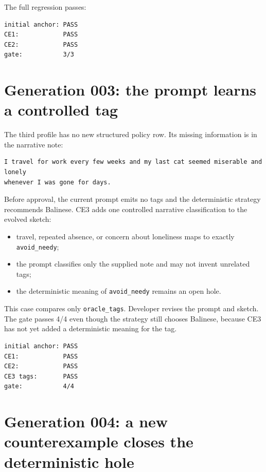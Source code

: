 The full regression passes:

\begin{verbatim}
initial anchor: PASS
CE1:            PASS
CE2:            PASS
gate:           3/3
\end{verbatim}

\section{Generation 003: the prompt learns a controlled tag}\label{generation-003-the-prompt-learns-a-controlled-tag}

The third profile has no new structured policy row. Its missing information is in the narrative
note:

\begin{verbatim}
I travel for work every few weeks and my last cat seemed miserable and lonely
whenever I was gone for days.
\end{verbatim}

Before approval, the current prompt emits no tags and the deterministic strategy recommends
Balinese. CE3 adds one controlled narrative classification to the evolved sketch:

\begin{itemize}
\tightlist
\item
  travel, repeated absence, or concern about loneliness maps to exactly \texttt{avoid\_needy};
\item
  the prompt classifies only the supplied note and may not invent unrelated tags;
\item
  the deterministic meaning of \texttt{avoid\_needy} remains an open hole.
\end{itemize}

This case compares only \texttt{oracle\_tags}. Developer revises the prompt and sketch. The gate
passes 4/4 even though the strategy still chooses Balinese, because CE3 has not yet added a
deterministic meaning for the tag.

\begin{verbatim}
initial anchor: PASS
CE1:            PASS
CE2:            PASS
CE3 tags:       PASS
gate:           4/4
\end{verbatim}

\section{Generation 004: a new counterexample closes the deterministic hole}\label{generation-004-a-new-counterexample-closes-the-deterministic-hole}

